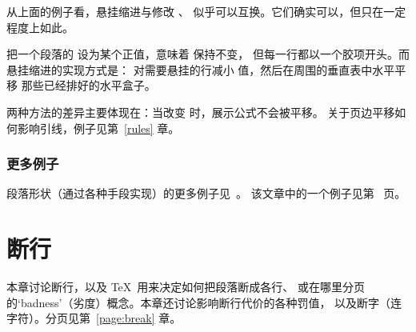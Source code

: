 \documentclass[a4paper]{rapport3}
\begin{document}
从上面的例子看，悬挂缩进与修改 、
似乎可以互换。它们确实可以，但只在一定程度上如此。
\altt

把一个段落的  设为某个正值，意味着  保持不变，
但每一行都以一个胶项开头。而悬挂缩进的实现方式是：
对需要悬挂的行减小  值，然后在周围的垂直表中水平平移
那些已经排好的水平盒子。

两种方法的差异主要体现在：当改变  时，展示公式不会被平移。
关于页边平移如何影响引线，例子见第~\ref{rules} 章。

\subsection{更多例子}

段落形状（通过各种手段实现）的更多例子见~\cite{E1}。
该文章中的一个例子见第~\pageref{varioset} 页。

\endofchapter
\chapter{断行}\label{line:break}

本章讨论断行，以及 \TeX\ 用来决定如何把段落断成各行、
或在哪里分页的`badness'（劣度）概念。本章还讨论影响断行代价的各种罚值，
以及断字（连字符）。分页见第~\ref{page:break} 章。
\end{document}
